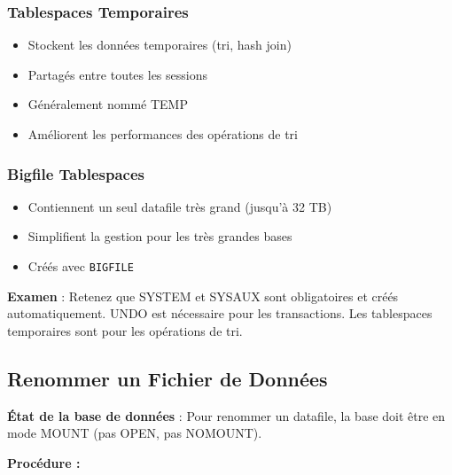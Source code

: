 \documentclass[11pt,a4paper]{article}
\begin{document}
\subsubsection{Tablespaces Temporaires}

\begin{itemize}
    \item Stockent les données temporaires (tri, hash join)
    \item Partagés entre toutes les sessions
    \item Généralement nommé TEMP
    \item Améliorent les performances des opérations de tri
\end{itemize}

\subsubsection{Bigfile Tablespaces}

\begin{itemize}
    \item Contiennent un seul datafile très grand (jusqu'à 32 TB)
    \item Simplifient la gestion pour les très grandes bases
    \item Créés avec \texttt{BIGFILE}
\end{itemize}

\begin{tipbox}
\textbf{Examen} : Retenez que SYSTEM et SYSAUX sont obligatoires et créés automatiquement. UNDO est nécessaire pour les transactions. Les tablespaces temporaires sont pour les opérations de tri.
\end{tipbox}

\subsection{Renommer un Fichier de Données}

\begin{importantbox}
\textbf{État de la base de données} : Pour renommer un datafile, la base doit être en mode MOUNT (pas OPEN, pas NOMOUNT).
\end{importantbox}

\textbf{Procédure :}
\end{document}

